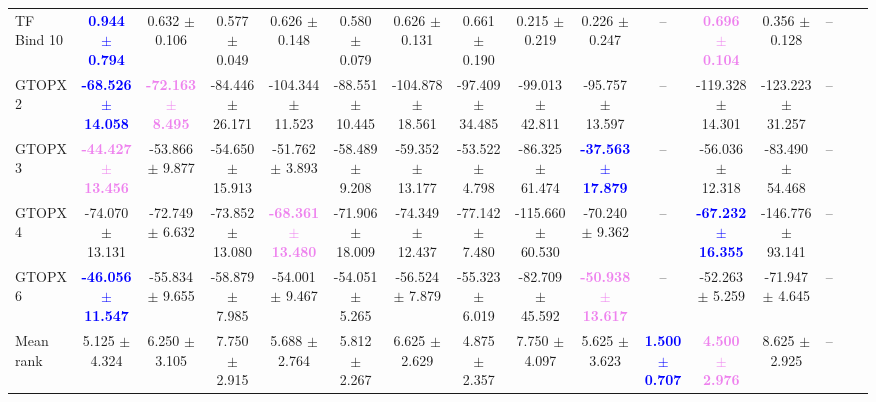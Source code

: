 \begin{table}[t!]
{\begin{tabular}{l|c|c|c|*{12}{c}}
TF Bind 10 & \textbf{\textcolor{blue}{0.944 $\pm$ 0.794}} & 0.632 $\pm$ 0.106 & 0.577 $\pm$ 0.049 & 0.626 $\pm$ 0.148 & 0.580 $\pm$ 0.079 & 0.626 $\pm$ 0.131 & 0.661 $\pm$ 0.190 & 0.215 $\pm$ 0.219 & 0.226 $\pm$ 0.247 & -- & \textbf{\textcolor{violet}{0.696 $\pm$ 0.104}} & 0.356 $\pm$ 0.128 & -- \\
GTOPX 2 & \textbf{\textcolor{blue}{-68.526 $\pm$ 14.058}} & \textbf{\textcolor{violet}{-72.163 $\pm$ 8.495}} & -84.446 $\pm$ 26.171 & -104.344 $\pm$ 11.523 & -88.551 $\pm$ 10.445 & -104.878 $\pm$ 18.561 & -97.409 $\pm$ 34.485 & -99.013 $\pm$ 42.811 & -95.757 $\pm$ 13.597 & -- & -119.328 $\pm$ 14.301 & -123.223 $\pm$ 31.257 & -- \\
GTOPX 3 & \textbf{\textcolor{violet}{-44.427 $\pm$ 13.456}} & -53.866 $\pm$ 9.877 & -54.650 $\pm$ 15.913 & -51.762 $\pm$ 3.893 & -58.489 $\pm$ 9.208 & -59.352 $\pm$ 13.177 & -53.522 $\pm$ 4.798 & -86.325 $\pm$ 61.474 & \textbf{\textcolor{blue}{-37.563 $\pm$ 17.879}} & -- & -56.036 $\pm$ 12.318 & -83.490 $\pm$ 54.468 & -- \\
GTOPX 4 & -74.070 $\pm$ 13.131 & -72.749 $\pm$ 6.632 & -73.852 $\pm$ 13.080 & \textbf{\textcolor{violet}{-68.361 $\pm$ 13.480}} & -71.906 $\pm$ 18.009 & -74.349 $\pm$ 12.437 & -77.142 $\pm$ 7.480 & -115.660 $\pm$ 60.530 & -70.240 $\pm$ 9.362 & -- & \textbf{\textcolor{blue}{-67.232 $\pm$ 16.355}} & -146.776 $\pm$ 93.141 & -- \\
GTOPX 6 & \textbf{\textcolor{blue}{-46.056 $\pm$ 11.547}} & -55.834 $\pm$ 9.655 & -58.879 $\pm$ 7.985 & -54.001 $\pm$ 9.467 & -54.051 $\pm$ 5.265 & -56.524 $\pm$ 7.879 & -55.323 $\pm$ 6.019 & -82.709 $\pm$ 45.592 & \textbf{\textcolor{violet}{-50.938 $\pm$ 13.617}} & -- & -52.263 $\pm$ 5.259 & -71.947 $\pm$ 4.645 & -- \\
\midrule
Mean rank & 5.125 $\pm$ 4.324 & 6.250 $\pm$ 3.105 & 7.750 $\pm$ 2.915 & 5.688 $\pm$ 2.764 & 5.812 $\pm$ 2.267 & 6.625 $\pm$ 2.629 & 4.875 $\pm$ 2.357 & 7.750 $\pm$ 4.097 & 5.625 $\pm$ 3.623 & \textbf{\textcolor{blue}{1.500 $\pm$ 0.707}} & \textbf{\textcolor{violet}{4.500 $\pm$ 2.976}} & 8.625 $\pm$ 2.925 & -- \\
\bottomrule
\end{tabular}
}
\label{tab:gtg-gtgdfgo-eval-m12}
\end{table}
